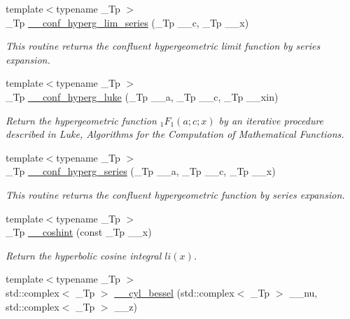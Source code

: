 \begin{DoxyCompactItemize}
{\footnotesize template$<$typename \+\_\+\+Tp $>$ }\\\+\_\+\+Tp \hyperlink{namespacestd_1_1____detail_a44b73ec79e0a8cfd1f29a21cb39f2bdc}{\+\_\+\+\_\+conf\+\_\+hyperg\+\_\+lim\+\_\+series} (\+\_\+\+Tp \+\_\+\+\_\+c, \+\_\+\+Tp \+\_\+\+\_\+x)
\begin{DoxyCompactList}\small\item\em This routine returns the confluent hypergeometric limit function by series expansion. \end{DoxyCompactList}\item 
{\footnotesize template$<$typename \+\_\+\+Tp $>$ }\\\+\_\+\+Tp \hyperlink{namespacestd_1_1____detail_ac3b4c72998f9d7deb6d79bda93220e58}{\+\_\+\+\_\+conf\+\_\+hyperg\+\_\+luke} (\+\_\+\+Tp \+\_\+\+\_\+a, \+\_\+\+Tp \+\_\+\+\_\+c, \+\_\+\+Tp \+\_\+\+\_\+xin)
\begin{DoxyCompactList}\small\item\em Return the hypergeometric function $ _1F_1(a;c;x) $ by an iterative procedure described in Luke, Algorithms for the Computation of Mathematical Functions. \end{DoxyCompactList}\item 
{\footnotesize template$<$typename \+\_\+\+Tp $>$ }\\\+\_\+\+Tp \hyperlink{namespacestd_1_1____detail_a5f701a63e17238132405dd209660fc1d}{\+\_\+\+\_\+conf\+\_\+hyperg\+\_\+series} (\+\_\+\+Tp \+\_\+\+\_\+a, \+\_\+\+Tp \+\_\+\+\_\+c, \+\_\+\+Tp \+\_\+\+\_\+x)
\begin{DoxyCompactList}\small\item\em This routine returns the confluent hypergeometric function by series expansion. \end{DoxyCompactList}\item 
{\footnotesize template$<$typename \+\_\+\+Tp $>$ }\\\+\_\+\+Tp \hyperlink{namespacestd_1_1____detail_ad48a89a591f7b58a047f072e6e383663}{\+\_\+\+\_\+coshint} (const \+\_\+\+Tp \+\_\+\+\_\+x)
\begin{DoxyCompactList}\small\item\em Return the hyperbolic cosine integral $ li(x) $. \end{DoxyCompactList}\item 
{\footnotesize template$<$typename \+\_\+\+Tp $>$ }\\std\+::complex$<$ \+\_\+\+Tp $>$ \hyperlink{namespacestd_1_1____detail_ac4cff6a34fbd90932b47ecdb2445dee2}{\+\_\+\+\_\+cyl\+\_\+bessel} (std\+::complex$<$ \+\_\+\+Tp $>$ \+\_\+\+\_\+nu, std\+::complex$<$ \+\_\+\+Tp $>$ \+\_\+\+\_\+z)

\end{DoxyCompactItemize}
